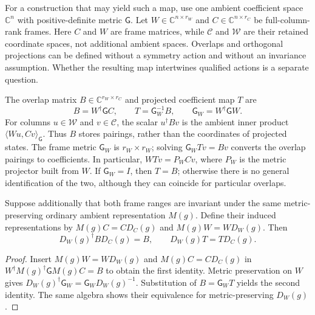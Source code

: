 For a construction that may yield such a map, use one ambient coefficient
space $\mathbb C^n$ with positive-definite metric $\mathsf G$. Let
$W\in\mathbb C^{n\times r_W}$ and $C\in\mathbb C^{n\times r_C}$ be
full-column-rank frames. Here $C$ and $W$ are frame matrices, while
$\mathcal C$ and $\mathcal W$ are their retained coordinate spaces, not
additional ambient spaces. Overlaps and orthogonal projections can be defined
without a symmetry action and without an invariance assumption. Whether the
resulting map intertwines qualified actions is a separate question.

\begin{definition}
\label{def:symmetry-overlap-form}
The overlap matrix $B\in\mathbb C^{r_W\times r_C}$ and projected coefficient
map $T$ are
\begin{equation}
  B=W^{\dagger}\mathsf G C,\qquad
  T=\mathsf G_W^{-1}B,\qquad \mathsf G_W=W^{\dagger}\mathsf G W.
  \label{eq:symmetry-overlap-coefficient-map}
\end{equation}
For columns $u\in\mathcal W$ and $v\in\mathcal C$, the scalar
$u^{\dagger}Bv$ is the ambient inner product $\langle Wu,Cv\rangle_{\mathsf G}$.
Thus $B$ stores pairings, rather than the coordinates of projected states.
The frame metric $\mathsf G_W$ is $r_W\times r_W$; solving
$\mathsf G_W Tv=Bv$ converts the overlap pairings to coefficients. In
particular, $WTv=P_W Cv$, where $P_W$ is the metric projector built from $W$.
If $\mathsf G_W=I$, then $T=B$; otherwise there is no general identification
of the two, although they can coincide for particular overlaps.
\end{definition}

\begin{proposition}
Suppose additionally that both frame ranges are invariant under the same
metric-preserving ordinary ambient representation $M(g)$. Define their
induced representations by $M(g)C=CD_C(g)$ and $M(g)W=WD_W(g)$. Then
\begin{equation}
  D_W(g)^{\dagger}BD_C(g)=B,
  \qquad D_W(g)T=TD_C(g).
  \label{eq:symmetry-overlap-intertwiner}
\end{equation}
\end{proposition}
\begin{proof}
Insert $M(g)W=WD_W(g)$ and $M(g)C=CD_C(g)$ in
$W^{\dagger}M(g)^{\dagger}\mathsf G M(g)C=B$ to obtain the first identity.
Metric preservation on $W$ gives
$D_W(g)^{\dagger}\mathsf G_W=\mathsf G_WD_W(g)^{-1}$.
Substitution of $B=\mathsf G_WT$ yields the second identity. The same algebra
shows their equivalence for metric-preserving $D_W(g)$.
\end{proof}

